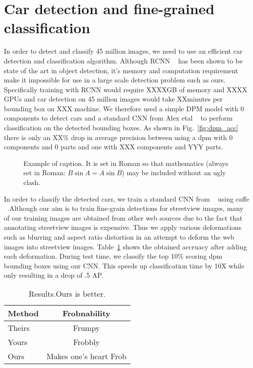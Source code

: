\documentclass[10pt,twocolumn,letterpaper]{article}
\begin{document}
\section{Car detection and fine-grained classification}
In order to detect and classify 45 million images, we need to use an efficient car detection and classification algorithm. Although RCNN ~\cite{rcnn} has been shown to be state of the art in object detection, it's memory and computation requirement make it impossible for use in a large scale detection problem such as ours. Specifically training with RCNN  would require XXXXGB of memory and XXXX GPUs and car detection on 45 million images would take XXminutes per bounding box on XXX machine. We therefore used a simple DPM model with 0 components to detect cars and a standard CNN from Alex etal ~\cite{alexnet} to perform classification on the detected bounding boxes. As shown in Fig.~\ref{fig:dpm_acc} there is only an XX\% drop in average precision between using a dpm with 0 components and 0 parts and one with XXX components and YYY parts.

\begin{figure}[t]
\begin{center}
\fbox{\rule{0pt}{2in} \rule{0.9\linewidth}{0pt}}
\end{center}
   \caption{Example of caption.  It is set in Roman so that mathematics
   (always set in Roman: $B \sin A = A \sin B$) may be included without an
   ugly clash.}
\label{fig:dataset5}
\end{figure}

In order to classify the detected cars, we train a standard CNN from ~\cite{alexnet} using caffe ~\cite{caffe}.Although our aim is to train fine-grain detections for streetview images, many of our training images are obtained from other web sources due to the fact that annotating streetview images is expensive. Thus we apply various deformations such as blurring and aspect ratio distortion in an attempt to deform the web images into streetview images. Table~\ref{table:acc-deformation} shows the obtained accruacy after adding each deformation. During test time, we classify the top 10\% scoring dpm bounding boxes using our CNN. This speeds up classification time by 10X while only resulting in a drop of .5 AP. 

\begin{table}
\begin{center}
\begin{tabular}{|l|c|}
\hline
Method & Frobnability \\
\hline\hline
Theirs & Frumpy \\
Yours & Frobbly \\
Ours & Makes one's heart Frob\\
\hline
\end{tabular}
\end{center}
\caption{Results.Ours is better.}
\label{table:acc-deformation}
\end{table}
\end{document}
